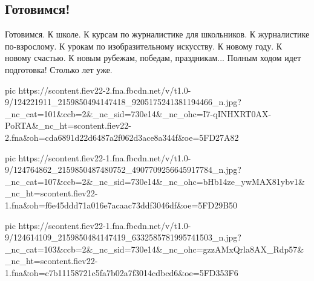  
 
 

\subsection{Готовимся!}
\label{sec:09_11_2020.fb.roman_barashev.2.gotovimsja}

\obeycr
Готовимся.
К школе.
К курсам по журналистике для школьников.
К журналистике по-взрослому.
К урокам по изобразительному искусству.
К новому году.
К новому счастью.
К новым рубежам, победам, праздникам...
Полным ходом идет подготовка!
Столько лет уже.
\restorecr

\ifcmt
pic https://scontent.fiev22-2.fna.fbcdn.net/v/t1.0-9/124221911_2159850494147418_9205175241381194466_n.jpg?_nc_cat=101&ccb=2&_nc_sid=730e14&_nc_ohc=I7-qINHXRT0AX-PoRTA&_nc_ht=scontent.fiev22-2.fna&oh=cda6891d22d6487a2f062d3ace8a344f&oe=5FD27A82

pic https://scontent.fiev22-1.fna.fbcdn.net/v/t1.0-9/124764862_2159850487480752_4907709256645917784_n.jpg?_nc_cat=107&ccb=2&_nc_sid=730e14&_nc_ohc=bHb14ze_ywMAX81ybv1&_nc_ht=scontent.fiev22-1.fna&oh=f6e45ddd71a016e7acaac73ddf3046df&oe=5FD29B50

pic https://scontent.fiev22-1.fna.fbcdn.net/v/t1.0-9/124614109_2159850484147419_6332585781995741503_n.jpg?_nc_cat=103&ccb=2&_nc_sid=730e14&_nc_ohc=gzzAMxQrla8AX_Rdp57&_nc_ht=scontent.fiev22-1.fna&oh=c7b11158721c5fa7b02a7f3014cdbcd6&oe=5FD353F6
\fi
